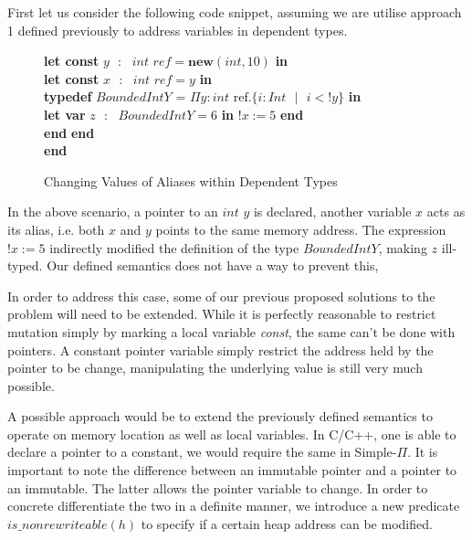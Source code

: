 \documentclass[a4paper,12pt]{report}
\newenvironment{tabs}[1]
 {\flushleft\TabPositions{#1}}
 {\endflushleft}
\begin{document}
\par
First let us consider the following code snippet, assuming we are utilise 
approach 1 defined previously to address variables in dependent types.

\begin{figure} [H]
  \begin{tabs}{1cm,2cm}
    \textbf{let const }$y\text{ }:\text{ } int \textit{ ref} = \textbf{new}(int, 10)$\textbf{ in } \\
    \textbf{let const }$x\text{ }:\text{ }int\textit{ ref} = y$\textbf{ in } \\
    \tab\textbf{typedef }$BoundedIntY$ = $\Pi y : int\text{ ref}. \{i : Int\text{ }|\text{ }i < !y\}$ \textbf{ in } \\ 
    \tab\tab\textbf{let var }$z\text{ }:\text{ }BoundedIntY = 6$ \textbf{ in }$!x := 5$\textbf { end }\\
    \tab\textbf {end} \textbf{end} \\
    \textbf{end}
  \end{tabs}  
  \caption{Changing Values of Aliases within Dependent Types}
\end{figure}

\par
In the above scenario, a pointer to an $int$ $y$ is declared, another variable $x$ 
acts as its alias, i.e. both $x$ and $y$ points to the same memory address. The 
expression $!x := 5$ indirectly modified the definition of the type 
$BoundedIntY$, making $z$ ill-typed. Our defined semantics does not have a way 
to prevent this,

\par
In order to address this case, some of our previous proposed solutions 
to the problem will need to be extended. While it is perfectly reasonable to 
restrict mutation simply by marking a local variable \textit{const}, 
the same can't be done with pointers. A constant 
pointer variable simply restrict the address held by the pointer to be change, 
manipulating the underlying value is still very much possible.

\par
A possible approach would be to extend the previously defined semantics to 
operate on memory location as well as local variables. In C/C++, one is able to 
declare a pointer to a constant, we would require the same in Simple-$\Pi$. It 
is important to note the difference between an immutable pointer and a pointer 
to an immutable. The latter allows the pointer variable to change. In order to 
concrete differentiate the two in a definite manner, we introduce 
a new predicate $is\_nonrewriteable(h)$ to specify if a 
certain heap address can be modified. 
\end{document}
